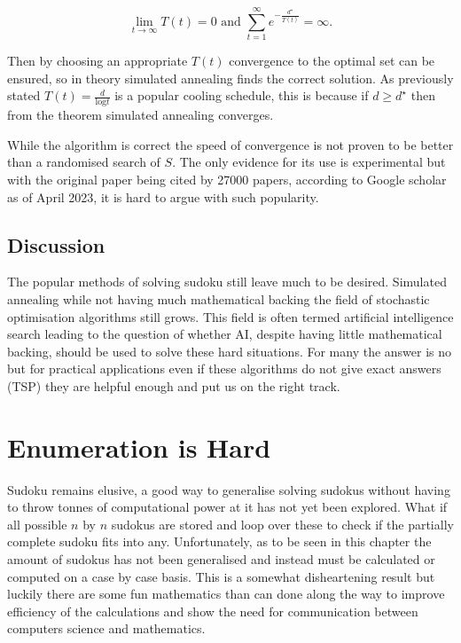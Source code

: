 \documentclass[a4paper,11pt]{report}
\newcounter{row}
\begin{document}
\begin{equation}\lim_{t\rightarrow\infty}T(t)=0 \text{ and } \sum^\infty_{t=1}e^{-\frac{d^\star}{T(t)}}=\infty.\end{equation} 

Then by choosing an appropriate $T(t)$ convergence to the optimal set can be ensured, so in theory simulated annealing finds the correct solution. As previously stated $T(t)=\frac{d}{\text{log}t}$ is a popular cooling schedule, this is because if $d\geq d^\star$ then from the theorem simulated annealing converges.

While the algorithm is correct the speed of convergence is not proven to be better than a randomised search of $S$. The only evidence for its use is experimental but with the original paper \cite{kirkpatrick1983optimization} being cited by 27000 papers, according to Google scholar as of April 2023, it is hard to argue with such popularity.

\section{Discussion}

The popular methods of solving sudoku still leave much to be desired. Simulated annealing while not having much mathematical backing the field of stochastic optimisation algorithms still grows. This field is often termed artificial intelligence search leading to the question of whether AI, despite having little mathematical backing, should be used to solve these hard situations. For many the answer is no but for practical applications even if these algorithms do not give exact answers (TSP) they are helpful enough and put us on the right track.

\chapter{Enumeration is Hard}

Sudoku remains elusive, a good way to generalise solving sudokus without having to throw tonnes of computational power at it has not yet been explored. What if all possible $n$ by $n$ sudokus are stored and loop over these to check if the partially complete sudoku fits into any. Unfortunately, as to be seen in this chapter the amount of sudokus has not been generalised and instead must be calculated or computed on a case by case basis. This is a somewhat disheartening result but luckily there are some fun mathematics than can done along the way to improve efficiency of the calculations and show the need for communication between computers science and mathematics.
\end{document}
